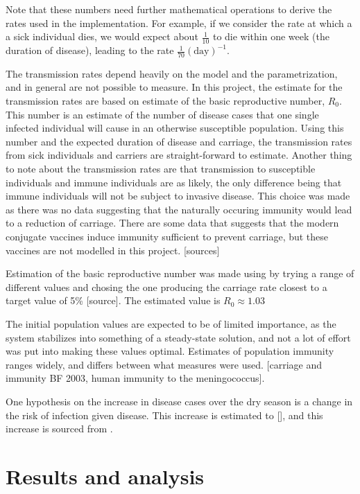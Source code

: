 \documentclass[10pt,a4paper]{article}
\begin{document}
Note that these numbers need further mathematical operations to derive the rates used in the implementation. For example, if we consider the rate at which a a sick individual dies, we would expect about $\frac{1}{10}$ to die within one week (the duration of disease), leading to the rate $\frac{1}{70} \left( \textrm{day} \right)^{-1}$.

The transmission rates depend heavily on the model and the parametrization, and in general are not possible to measure. In this project, the estimate for the transmission rates are based on estimate of the basic reproductive number, $R_0$. This number is an estimate of the number of disease cases that one single infected individual will cause in an otherwise susceptible population. Using this number and the expected duration of disease and carriage, the transmission rates from sick individuals and carriers are straight-forward to estimate. Another thing to note about the transmission rates are that transmission to susceptible individuals and immune individuals are as likely, the only difference being that immune individuals will not be subject to invasive disease. This choice was made as there was no data suggesting that the naturally occuring immunity would lead to a reduction of carriage. There are some data that suggests that the modern conjugate vaccines induce immunity sufficient to prevent carriage, but these vaccines are not modelled in this project. [sources]

Estimation of the basic reproductive number was made using by trying a range of different values and chosing the one producing the carriage rate closest to a target value of 5\% [source]. The estimated value is $R_0 \approx 1.03$

The initial population values are expected to be of limited importance, as the system stabilizes into something of a steady-state solution, and not a lot of effort was put into making these values optimal. Estimates of population immunity ranges widely, and differs between what measures were used. [carriage and immunity BF 2003, human immunity to the meningococcus].

One hypothesis on the increase in disease cases over the dry season is a change in the risk of infection given disease. This increase is estimated to [], and this increase is sourced from \cite{mueller2010hypothetical}.


\section{Results and analysis}
\end{document}
